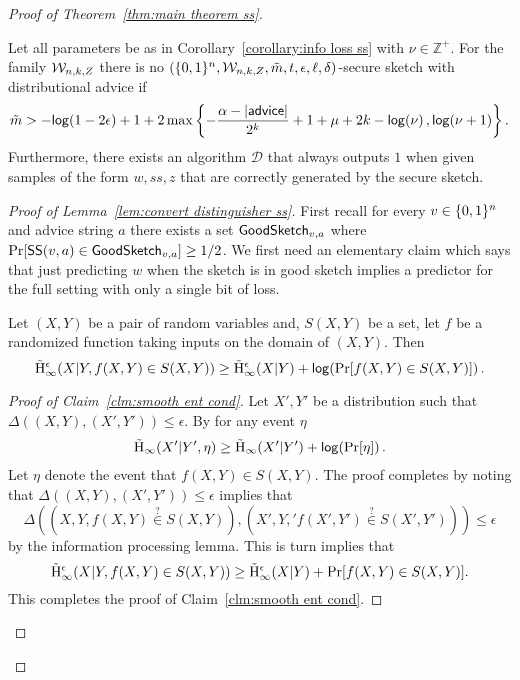 \begin{proof}[Proof of Theorem~\ref{thm:main theorem ss}]
\begin{lemma}
\label{lem:convert distinguisher ss}
Let all parameters be as in Corollary~\ref{corollary:info loss ss} with $\nu \in\mathbb{Z}^+$.  For the family $\mathcal{W}_{n,k, Z}$ there is no $(\{0,1\}^n, \mathcal{W}_{n,k, Z}, \tilde{m}, t, \epsilon, \ell, \delta)$-secure sketch with distributional advice if
\[
\tilde{m}> -\mathsf{log}\!\left(1-2\epsilon\right) +1 + 2\max\left\{-\frac{\alpha-|{\mathsf{advice}}|}{2^k}+1+\mu+2k-\mathsf{log}\!\left(\nu\right), \mathsf{log}\!\left(\nu+1\right)\right\}.
\]
\noindent
Furthermore, there exists an algorithm $\mathcal{D}$ that always outputs $1$ when given samples of the form $w, ss, z$ that are correctly generated by the secure sketch. 
\end{lemma}
\begin{proof}[Proof of Lemma~\ref{lem:convert distinguisher ss}]
First recall for every $v\in \{0, 1\}^n$ and advice string $a$  there exists a set $\mathsf{GoodSketch}_{v, a}$ where $\Pr[{\mathsf{SS}}(v, a) \in\mathsf{GoodSketch}_{v,a}]\ge 1/2$. 
We first need an elementary claim which says that just predicting $w$ when the sketch is in good sketch implies a predictor for the full setting with only a single bit of loss. 
\begin{claim}
Let $(X, Y)$ be a pair of random variables and, $S(X, Y)$ be a set, let $f$ be a randomized function taking inputs on the domain of $(X, Y)$. Then \label{clm:smooth ent cond}
\[
\tilde{\mathrm{H}}_\infty^\epsilon(X|Y, f(X, Y) \in S(X, Y))\ge \tilde{\mathrm{H}}_\infty^\epsilon(X|Y) + \mathsf{log}\!\left( \Pr[f(X, Y) \in S(X, Y)]\right).
\]
\end{claim}
\begin{proof}[Proof of Claim~\ref{clm:smooth ent cond}]
Let $X', Y'$ be a distribution such that $\Delta((X, Y), (X', Y')) \le \epsilon$.  By \cite[Lemma 7.8]{fuller2020fuzzy} for any event $\eta$
\begin{align*}
\tilde{\mathrm{H}}_\infty(X'| Y', \eta) \ge \tilde{\mathrm{H}}_\infty(X' | Y') +\mathsf{log}\!\left(\Pr[\eta]\right).
\end{align*}
Let $\eta$ denote the event that $f(X, Y) \in S(X, Y)$.
The proof completes by noting that $\Delta((X, Y), (X', Y'))\le \epsilon$ implies that 
\[
\Delta((X, Y, f(X, Y) \overset{?}\in S(X, Y)), (X', Y,' f(X', Y')\overset{?}\in S(X', Y')))\le \epsilon\] by the information processing lemma. This is turn implies that 
\[
\tilde{\mathrm{H}}_\infty^\epsilon(X|Y, f(X, Y) \in S(X, Y))\ge \tilde{\mathrm{H}}_\infty^\epsilon(X|Y) +\Pr[f(X, Y) \in S(X, Y)].
\]
This completes the proof of Claim~\ref{clm:smooth ent cond}.
\end{proof}


\end{proof}
\end{proof}
